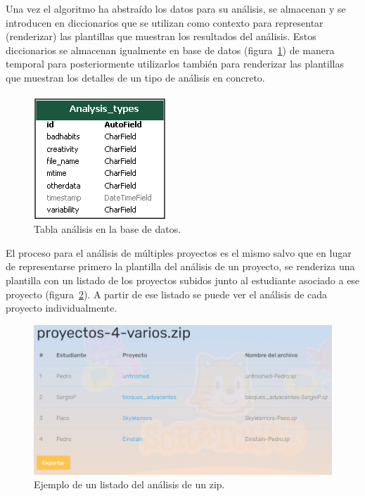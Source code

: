 \documentclass[a4paper, 12pt]{book}
\begin{document}

Una vez el algoritmo ha abstraído los datos para su análisis, se almacenan y se introducen en diccionarios que se utilizan como contexto para representar (renderizar) las plantillas que muestran los resultados del análisis.
Estos diccionarios se almacenan igualmente en base de datos (figura~\ref{fig:bd_analisis}) de manera temporal para posteriormente utilizarlos también para renderizar las plantillas que muestran los detalles de un tipo de análisis en concreto.

\newpage
\begin{figure}[H]
  \centering
  \includegraphics[keepaspectratio]{img/bd_analisis.png}
  \caption{Tabla análisis en la base de datos.}\label{fig:bd_analisis}
\end{figure}

El proceso para el análisis de múltiples proyectos es el mismo salvo que en lugar de representarse primero la plantilla del análisis de un proyecto, se renderiza una plantilla con un listado de los proyectos subidos junto al estudiante asociado a ese proyecto (figura~\ref{fig:listado_zip}).
A partir de ese listado se puede ver el análisis de cada proyecto individualmente.

\vspace{4mm}
\begin{figure}[H]
  \centering
  \includegraphics[width=13cm, keepaspectratio]{img/listado_zip.png}
  \caption{Ejemplo de un listado del análisis de un zip.}\label{fig:listado_zip}
\end{figure}
\end{document}
